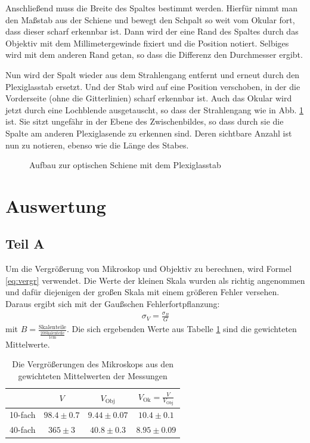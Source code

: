 \documentclass[12pt,a4paper,titlepage,headinclude,bibtotoc]{scrartcl}
\begin{document}
Anschließend muss die Breite des Spaltes bestimmt werden.
Hierfür nimmt man den Maßstab aus der Schiene und bewegt den Schpalt so weit vom Okular fort, dass dieser scharf erkennbar ist.
Dann wird der eine Rand des Spaltes durch das Objektiv mit dem Millimetergewinde fixiert und die Position notiert.
Selbiges wird mit dem anderen Rand getan, so dass die Differenz den Durchmesser ergibt.

Nun wird der Spalt wieder aus dem Strahlengang entfernt und erneut durch den Plexiglasstab ersetzt.
Und der Stab wird auf eine Position verschoben, in der die Vorderseite (ohne die Gitterlinien) scharf erkennbar ist.
Auch das Okular wird jetzt durch eine Lochblende ausgetauscht, so dass der Strahlengang wie in Abb. \ref{fig:strahl3} ist.
Sie sitzt ungefähr in der Ebene des Zwischenbildes, so dass durch sie die Spalte am anderen Plexiglasende zu erkennen sind.
Deren sichtbare Anzahl ist nun zu notieren, ebenso wie die Länge des Stabes.

\begin{figure}[h]
\centering
\def\svgwidth{0.7\linewidth}

\caption{Aufbau zur optischen Schiene mit dem Plexiglasstab\protect\footnotemark}
\label{fig:strahl3}
\end{figure}

\section{Auswertung}
\label{sec:auswertung}
\subsection{Teil A}
Um die Vergrößerung von Mikroskop und Objektiv zu berechnen, wird Formel \eqref{eq:vergr} verwendet.
Die Werte der kleinen Skala wurden als richtig angenommen und dafür diejenigen der großen Skala mit einem größeren Fehler versehen.
Daraus ergibt sich mit der Gaußschen Fehlerfortpflanzung:
\begin{align*}
\sigma_V=\frac{\sigma_B}{G}
\end{align*}
mit $B=\frac{\text{Skalenteile}}{\frac{20\text{Skalenteile}}{1\si{\centi\metre}}}$.
Die sich ergebenden Werte aus Tabelle \ref{tab:vergr} sind die gewichteten Mittelwerte.
\begin{table}[!h]
\centering
\begin{tabular}{|c||c|c|c|}
\hline
 & $V$ & $V_\text{Obj}$ & $V_\text{Ok}=\frac{V}{V_\text{Obj}}$\\\hline\hline
10-fach & $98.4\pm0.7$ & $9.44\pm0.07$ & $10.4\pm 0.1$ \\\hline
40-fach & $365\pm 3$ & $40.8\pm 0.3$ &$8.95\pm0.09$ \\\hline
\end{tabular}
\caption{Die Vergrößerungen des Mikroskops aus den gewichteten Mittelwerten der Messungen}
\label{tab:vergr}
\end{table}
\end{document}
